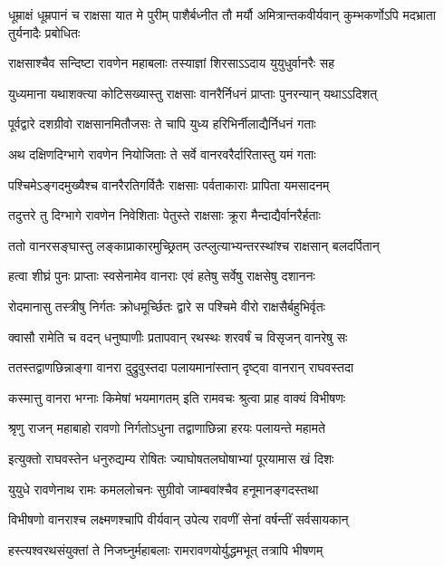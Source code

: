 \threelineshloka
{धूम्राक्षं धूम्रपानं च राक्षसा यात मे पुरीम्}
{पाशैर्बध्नीत तौ मर्यौ अमित्रान्तकवीर्यवान्}
{कुम्भकर्णोऽपि मदभ्राता तुर्यनादैः प्रबोधितः} %

\twolineshloka
{राक्षसाश्चैव सन्दिष्टा रावणेन महाबलाः}
{तस्याज्ञां शिरसाऽऽदाय युयुधुर्वानरैः सह} %

\twolineshloka
{युध्यमाना यथाशक्त्या कोटिसख्यास्तु राक्षसाः}
{वानरैर्निधनं प्राप्ताः पुनरन्यान् यथाऽऽदिशत्} %

\twolineshloka
{पूर्वद्वारे दशग्रीवो राक्षसानमितौजसः}
{ते चापि युध्य हरिभिर्नीलाद्यैर्निधनं गताः} %

\twolineshloka
{अथ दक्षिणदिग्भागे रावणेन नियोजिताः}
{ते सर्वे वानरवरैर्दारितास्तु यमं गताः} %

\twolineshloka
{पश्चिमेऽङ्गदमुख्यैश्च वानरैरतिगर्वितैः}
{राक्षसाः पर्वताकाराः प्रापिता यमसादनम्} %

\twolineshloka
{तदुत्तरे तु दिग्भागे रावणेन निवेशिताः}
{पेतुस्ते राक्षसाः क्रूरा मैन्दाद्यैर्वानरैर्हताः} %

\twolineshloka
{ततो वानरसङ्घास्तु लङ्काप्राकारमुच्छ्रितम्}
{उत्प्लुत्याभ्यन्तरस्थांश्च राक्षसान् बलदर्पितान्} %

\twolineshloka
{हत्वा शीघ्रं पुनः प्राप्ताः स्वसेनामेव वानराः}
{एवं हतेषु सर्वेषु राक्षसेषु दशाननः} %

\twolineshloka
{रोदमानासु तस्त्रीषु निर्गतः क्रोधमूर्च्छितः}
{द्वारे स पश्चिमे वीरो राक्षसैर्बहुभिर्वृतः} %

\twolineshloka
{क्वासौ रामेति च वदन् धनुष्पाणीः प्रतापवान्}
{रथस्थः शरवर्षं च विसृजन् वानरेषु सः} %

\twolineshloka
{ततस्तद्वाणछिन्नाङ्गा वानरा दुद्रुवुस्तदा}
{पलायमानांस्तान् दृष्ट्वा वानरान् राघवस्तदा} %

\twolineshloka
{कस्मात्तु वानरा भग्नाः किमेषां भयमागतम्}
{इति रामवचः श्रुत्वा प्राह वाक्यं विभीषणः} %

\twolineshloka
{श्रृणु राजन् महाबाहो रावणो निर्गतोऽधुना}
{तद्वाणाछिन्ना हरयः पलायन्ते महामते} %

\twolineshloka
{इत्युक्तो राघवस्तेन धनुरुद्यम्य रोषितः}
{ज्याघोषतलघोषाभ्यां पूरयामास खं दिशः} %

\twolineshloka
{युयुधे रावणेनाथ रामः कमललोचनः}
{सुग्रीवो जाम्बवांश्चैव हनूमानङ्गदस्तथा} %

\twolineshloka
{विभीषणो वानराश्च लक्ष्मणश्चापि वीर्यवान्}
{उपेत्य रावणीं सेनां वर्षन्तीं सर्वसायकान्} %

\twolineshloka
{हस्त्यश्वरथसंयुक्तां ते निजघ्नुर्महाबलाः}
{रामरावणयोर्युद्धमभूत् तत्रापि भीषणम्} %

